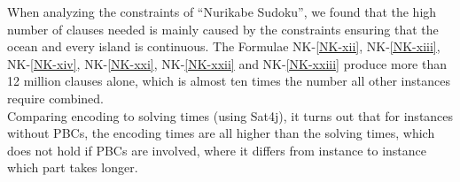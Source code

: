 When analyzing the constraints of ``Nurikabe Sudoku'', we found that the high number of clauses needed is mainly caused by the constraints ensuring that the ocean and every island is continuous. The Formulae NK-\ref{NK-xii}, NK-\ref{NK-xiii}, NK-\ref{NK-xiv}, NK-\ref{NK-xxi}, NK-\ref{NK-xxii} and NK-\ref{NK-xxiii} produce more than 12 million clauses alone, which is almost ten times the number all other instances require combined.\\

Comparing encoding to solving times (using Sat4j), it turns out that for instances without PBCs, the encoding times are all higher than the solving times, which does not hold if PBCs are involved, where it differs from instance to instance which part takes longer.






